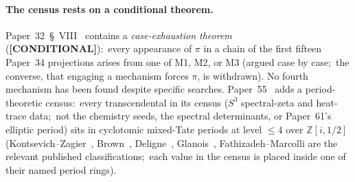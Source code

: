 \documentclass[11pt,a4paper]{article}
\newcommand{\Z}{\mathbb{Z}}
\newcommand{\gvc}[2]{#2}
\begin{document}
\paragraph{The census rests on a conditional theorem.}
\gvc{pi-source-case-exhaustion}{Paper~32~\S~VIII~\cite{loutey_paper32} contains a
\emph{case-exhaustion theorem} (\textbf{[CONDITIONAL]}):\ every
appearance of $\pi$ in a chain of the first fifteen Paper~34
projections arises from one of M1, M2, or M3 (argued case by case;\
the converse, that engaging a mechanism forces $\pi$, is withdrawn)}.  No fourth mechanism has been found despite specific searches.
Paper~55~\cite{loutey_paper55} adds a period-theoretic census:\ every
transcendental in its census ($S^3$ spectral-zeta and heat-trace data;\
not the chemistry seeds, the spectral determinants, or Paper~61's
elliptic period) sits in cyclotomic mixed-Tate periods at level $\le 4$
over $\Z[i, 1/2]$ (Kontsevich--Zagier~\cite{kontsevich_zagier2001},
Brown~\cite{brown2012}, Deligne~\cite{deligne2010},
Glanois~\cite{glanois2015}, Fathizadeh--Marcolli
\cite{fathizadeh_marcolli2016} are the relevant published
classifications;\ each value in the census is placed inside one of
their named period rings).
\end{document}
